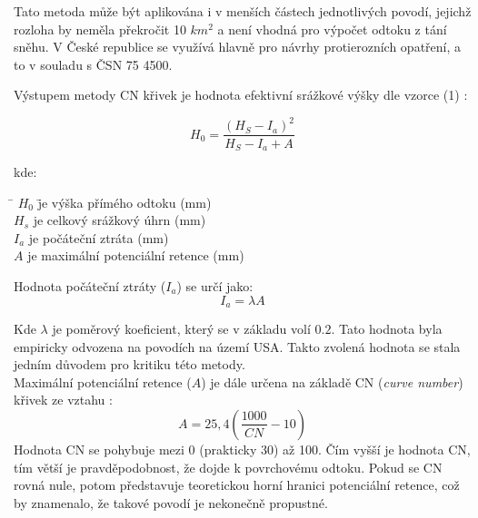\documentclass[a4paper,oneside,12pt]{book}
\begin{document}
\hspace{10mm} Tato metoda může být aplikována i v menších částech jednotlivých povodí, jejichž rozloha by neměla překročit 10 $km^{2}$ \cite{Pasak1983} a není vhodná pro výpočet odtoku z tání sněhu. V České republice se využívá hlavně pro návrhy protierozních opatření, a to v souladu s ČSN 75 4500. \cite{MNYDGwleJOjKdRUp}

Výstupem metody CN křivek je hodnota efektivní srážkové výšky dle vzorce (1) \cite{MNYDGwleJOjKdRUp} \cite{MNYDGwleJOjKLRU2} :


\begin{equation}
H_{0} = \frac{\displaystyle (H_{S} - I_{a})^{2}}{\displaystyle H_{S} - I_{a} + A}
\end{equation}

kde:
\begin{tabbing}
    \hspace{10mm} \= $H_{0}$ \hspace{5mm} \= je výška přímého odtoku (mm) \\
    \> $H_{s}$ \> je celkový srážkový úhrn (mm) \\
    \> $I_{a}$ \> je počáteční ztráta (mm) \\
    \> $A$ \> je maximální potenciální retence (mm)
\end{tabbing}

Hodnota počáteční ztráty ($I_{a}$) se určí jako:
\begin{equation}
I_{a} = \lambda A
\end{equation}

\hspace{10mm} Kde $\lambda$ je poměrový koeficient, který se v základu volí $0.2$. Tato hodnota byla empiricky odvozena na povodích na území USA. \cite{Lian2020}\cite{MNYDGwleJOjKLRU2} Takto zvolená hodnota se stala jedním důvodem pro kritiku této metody. \cite{MNYDGwleJOjKLRUp} \\

\hspace{10mm} Maximální potenciální retence ($A$) je dále určena na základě CN (\textit{curve number}) křivek ze vztahu \cite{MNYDGwleJOjKdRUp} : 
\begin{equation}
A = 25,4 (\frac{1000}{CN}-10)
\end{equation}
\hspace{10mm} Hodnota CN se pohybuje mezi 0 (prakticky 30) až 100. Čím vyšší je hodnota CN, tím větší je pravděpodobnost, že dojde k povrchovému odtoku. Pokud se CN rovná nule, potom představuje teoretickou horní
hranici potenciální retence, což by znamenalo, že takové povodí je nekonečně propustné. \cite{MNYDGwleJOjKLRU3}
\end{document}
